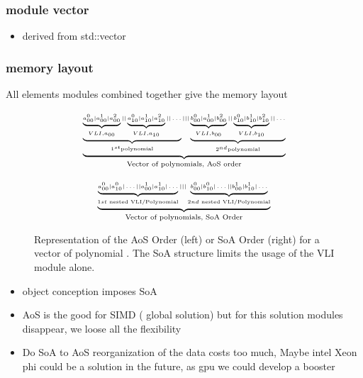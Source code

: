 \documentclass[oribibl]{llncs2e/llncs}
\begin{document}
\subsubsection{module vector}
\begin{itemize}
\item derived from  std::vector
\end{itemize}



\subsubsection{memory layout} 

All elements modules combined together give the memory layout

\begin{figure}
   \begin{minipage}{0.50\linewidth}
        \begin{eqnarray}
        \tiny{
                \underbrace{
                 \underbrace{ \underbrace{a^0_{00} | a^1_{00} | a^2_{00}}_{VLI, a_{00} } || \underbrace{a^0_{10} | a^1_{10} | a^2_{10}}_{VLI, a_{10}} ||   \dots  }_{1^{st} \textrm{polynomial}} 
                  |||    \underbrace{ \underbrace{b^0_{00} | a^1_{00} | b^2_{00}}_{VLI, b_{00} } || \underbrace{b^0_{10} | b^1_{10} | b^2_{10}}_{VLI, b_{10}} ||   \dots  }_{2^{nd} \textrm{polynomial} } }_{\textrm{Vector of polynomials, AoS order}} \nonumber
            }
        \end{eqnarray}
    \end{minipage}
\begin{minipage}{0.50\linewidth}
   \begin{eqnarray}
    \tiny{
        \underbrace{
        \underbrace{a^0_{00} | a^0_{10} | \dots || a^1_{00} | a^1_{10} | \dots  }_{1st  \textrm{ nested VLI/Polynomial} } |||  \underbrace{b^0_{00} | b^0_{10} | \dots || b^1_{00} | b^1_{10} | \dots  }_{2nd  \textrm{ nested VLI/Polynomial} }
        }_{\textrm{Vector of polynomials, SoA Order}} \nonumber }
       \end{eqnarray}
\end{minipage}
\caption{Representation of the AoS Order (left) or SoA Order (right) for a vector of polynomial \label{AOSSOA}.  The SoA structure limits the usage of the VLI module alone.}
\end{figure}


\begin{itemize}
\item object conception imposes SoA
\item AoS is the good for SIMD ( global solution) but for this solution modules disappear, we loose all the flexibility
\item  Do SoA to AoS reorganization of the data costs too much, Maybe intel Xeon phi could be a solution in the future, as gpu we could develop a booster
\end{itemize}
\end{document}

